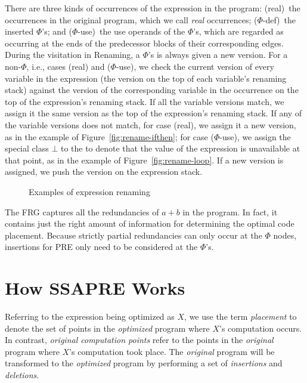 There are three kinds of occurrences of the expression in the program: 
(real)~the occurrences in the original program, which we call \emph{real} occurrences; 
($\Phi$-def)~the inserted $\Phi$'s; 
and ($\Phi$-use)~the use operands of the $\Phi$'s, which are regarded as occurring at the ends of the predecessor blocks of their corresponding edges. 
During the visitation in Renaming, a $\Phi$'s is always given a new version. 
For a non-$\Phi$, i.e., cases (real) and ($\Phi$-use), we check the current version of every variable in the expression (the version on the top of each variable's renaming stack) against the version of the corresponding variable in the occurrence on the top of the expression's renaming stack. 
If all the variable versions match, we assign it the same version as the top of the expression's renaming stack. 
If any of the variable versions does not match, for case (real), we assign it a new version, as in the example of Figure~\ref{fig:rename-ifthen}; 
for case ($\Phi$-use), we assign the special class $\bot$ to the \PHIuse to denote that the value of the expression is unavailable at that point, as in the example of Figure~\ref{fig:rename-loop}. 
If a new version is assigned, we push the version on the expression stack.

\begin{figure}
\centering
\caption{Examples of expression renaming}
\label{fig:rename}
\end{figure}
  
The FRG captures all the redundancies of $a+b$ in the program. 
In fact, it contains just the right amount of information for determining the optimal code placement. 
Because strictly partial redundancies can only occur at the $\Phi$ nodes, insertions for PRE only need to be considered at the $\Phi$'s.

\section{How SSAPRE Works}
\label{section:Part3:Pre_not_helped:SSAPRE}

Referring to the expression being optimized as $X$,
we use the term \emph{placement} to denote the set of points in the 
\emph{optimized} program where $X$'s computation occurs. In contrast,
\emph{original computation points} refer to the points in the \emph{original} 
program where $X$'s computation took place.  The \emph{original} program will be
transformed to the \emph{optimized} program by performing a set of
\emph{insertions} and \emph{deletions}.  

